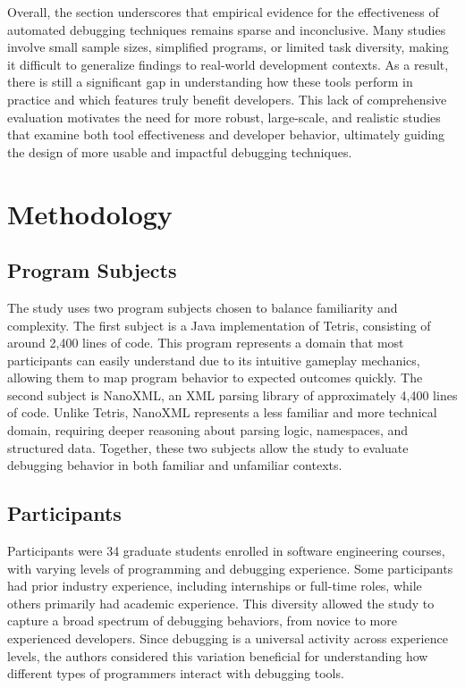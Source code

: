 Overall, the section underscores that empirical evidence for the effectiveness of automated debugging techniques remains sparse and inconclusive. Many studies involve small sample sizes, simplified programs, or limited task diversity, making it difficult to generalize findings to real-world development contexts. As a result, there is still a significant gap in understanding how these tools perform in practice and which features truly benefit developers. This lack of comprehensive evaluation motivates the need for more robust, large-scale, and realistic studies that examine both tool effectiveness and developer behavior, ultimately guiding the design of more usable and impactful debugging techniques.

\section{Methodology}
\subsection{Program Subjects}
The study uses two program subjects chosen to balance familiarity and complexity. The first subject is a Java implementation of Tetris, consisting of around 2,400 lines of code. This program represents a domain that most participants can easily understand due to its intuitive gameplay mechanics, allowing them to map program behavior to expected outcomes quickly. The second subject is NanoXML, an XML parsing library of approximately 4,400 lines of code. Unlike Tetris, NanoXML represents a less familiar and more technical domain, requiring deeper reasoning about parsing logic, namespaces, and structured data. Together, these two subjects allow the study to evaluate debugging behavior in both familiar and unfamiliar contexts.

\subsection{Participants}
Participants were 34 graduate students enrolled in software engineering courses, with varying levels of programming and debugging experience. Some participants had prior industry experience, including internships or full-time roles, while others primarily had academic experience. This diversity allowed the study to capture a broad spectrum of debugging behaviors, from novice to more experienced developers. Since debugging is a universal activity across experience levels, the authors considered this variation beneficial for understanding how different types of programmers interact with debugging tools.

